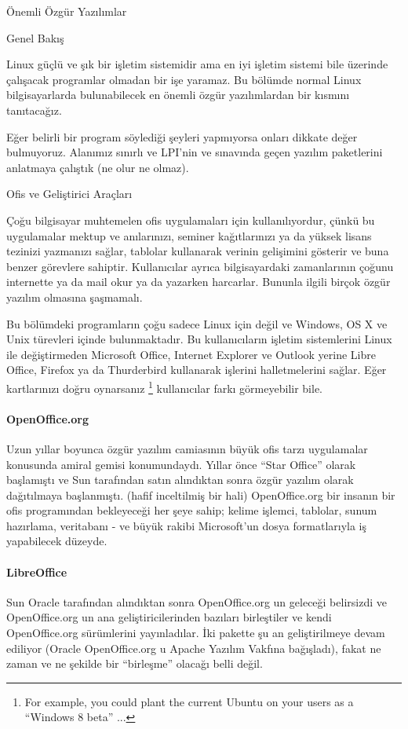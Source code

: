 \begin{section}{Önemli Özgür Yazılımlar}
\begin{subsection}{Genel Bakış}

Linux güçlü ve şık bir işletim sistemidir ama en iyi işletim sistemi bile üzerinde çalışacak programlar olmadan bir işe yaramaz. Bu bölümde normal Linux bilgisayarlarda bulunabilecek en önemli özgür yazılımlardan bir kısmını tanıtacağız.

Eğer belirli bir program söylediği şeyleri yapmıyorsa onları dikkate değer bulmuyoruz. Alanımız sınırlı ve LPI'nin ve sınavında geçen yazılım paketlerini anlatmaya çalıştık (ne olur ne olmaz).
\end{subsection}
\begin{subsection}{Ofis ve Geliştirici Araçları}

Çoğu bilgisayar muhtemelen ofis uygulamaları için kullanılıyordur, çünkü bu uygulamalar mektup ve anılarınızı, seminer kağıtlarınızı ya da yüksek lisans tezinizi yazmanızı sağlar, tablolar kullanarak verinin gelişimini gösterir ve buna benzer görevlere sahiptir. Kullanıcılar ayrıca bilgisayardaki zamanlarının çoğunu internette ya da mail okur ya da yazarken harcarlar. Bununla ilgili birçok özgür yazılım olmasına şaşmamalı.

Bu bölümdeki programların çoğu sadece Linux için değil ve Windows, OS X ve Unix türevleri içinde bulunmaktadır. Bu kullanıcıların işletim sistemlerini Linux ile değiştirmeden Microsoft Office, Internet Explorer ve Outlook yerine Libre Office, Firefox ya da Thurderbird kullanarak işlerini halletmelerini sağlar. Eğer kartlarınızı doğru oynarsanız
\footnote{For example, you could plant the current Ubuntu on your users as a “Windows 8 beta” ...} kullanıcılar farkı görmeyebilir bile.

\paragraph{OpenOffice.org}{Uzun yıllar boyunca özgür yazılım camiasının büyük ofis tarzı uygulamalar konusunda amiral gemisi konumundaydı. Yıllar önce “Star Office” olarak başlamıştı ve Sun tarafından satın alındıktan sonra özgür yazılım olarak dağıtılmaya başlanmıştı. (hafif inceltilmiş bir hali) OpenOffice.org bir insanın bir ofis programından bekleyeceği her şeye sahip; kelime işlemci, tablolar, sunum hazırlama, veritabanı - ve büyük rakibi Microsoft'un dosya formatlarıyla iş yapabilecek düzeyde.}
\paragraph{LibreOffice}{Sun Oracle tarafından alındıktan sonra OpenOffice.org un geleceği belirsizdi ve OpenOffice.org un ana geliştiricilerinden bazıları birleştiler ve kendi OpenOffice.org sürümlerini yayınladılar. İki pakette şu an geliştirilmeye devam ediliyor (Oracle OpenOffice.org u Apache Yazılım Vakfına bağışladı), fakat ne zaman ve ne şekilde bir “birleşme” olacağı belli değil.}


\end{subsection}
\end{section}
